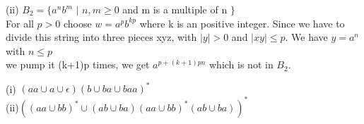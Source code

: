 \documentclass[12pt]{article}
\begin{document}
(ii)  $B_2 = \{  a^nb^m $  $ | $ $n,m\ge 0 $ and m is a multiple of n $ \}$\\

For all $p>0$ choose $w = a^pb^{kp}$ where k is an positive integer.
Since we have to divide this string into three pieces xyz, with $|y| > 0$ and $|xy| \le p$.
We have $y = a^n$ with $n\le p$\\
we pump it (k+1)p times, we get $a^{p+(k+1)pn} $ which is not in $B_2$.




(i) $  (aa\cup a \cup \epsilon)(b \cup ba \cup baa)^* $\\

(ii)$   ((aa \cup bb)^* \cup (ab\cup ba) (aa \cup bb)^*(ab\cup ba))^*    $\\
\end{document}
